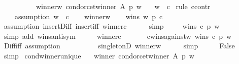 \begin{isabellebody}
\ \ \ \ \ \ \ \ \ \ winner{\isacharunderscore}{\kern0pt}w{\isacharcolon}{\kern0pt}\ {\isachardoublequoteopen}condorcet{\isacharunderscore}{\kern0pt}winner\ A\ p\ w{\isachardoublequoteclose}\isanewline
\ \ \ {\isachardoublequoteopen}w\ {\isacharequal}{\kern0pt}\ c{\isachardoublequoteclose}\isanewline
%
\isadelimproof
%
\endisadelimproof
%
\isatagproof
{}\isamarkupfalse%
\ {\isacharparenleft}{\kern0pt}rule\ ccontr{\isacharparenright}{\kern0pt}\isanewline
\ \ \isamarkupfalse%
\isanewline
\ \ \ \ assumption{\isacharcolon}{\kern0pt}\ {\isachardoublequoteopen}w\ {\isasymnoteq}\ c{\isachardoublequoteclose}\isanewline
\ \ \isamarkupfalse%
\ winner{\isacharunderscore}{\kern0pt}w\isanewline
\ \ \isamarkupfalse%
\ {\isachardoublequoteopen}wins\ w\ p\ c{\isachardoublequoteclose}\isanewline
\ \ \ \ \isamarkupfalse%
\ assumption\ insert{\isacharunderscore}{\kern0pt}Diff\ insert{\isacharunderscore}{\kern0pt}iff\ winner{\isacharunderscore}{\kern0pt}c\isanewline
\ \ \ \ \isamarkupfalse%
\ simp\isanewline
\ \ \isamarkupfalse%
\ {\isachardoublequoteopen}{\isasymnot}\ wins\ c\ p\ w{\isachardoublequoteclose}\isanewline
\ \ \ \ \isamarkupfalse%
\ {\isacharparenleft}{\kern0pt}simp\ add{\isacharcolon}{\kern0pt}\ wins{\isacharunderscore}{\kern0pt}antisym{\isacharparenright}{\kern0pt}\isanewline
\ \ \isamarkupfalse%
\ \isamarkupfalse%
\ winner{\isacharunderscore}{\kern0pt}c\isanewline
\ \ \isamarkupfalse%
\isanewline
\ \ \ \ c{\isacharunderscore}{\kern0pt}wins{\isacharunderscore}{\kern0pt}against{\isacharunderscore}{\kern0pt}w{\isacharcolon}{\kern0pt}\ {\isachardoublequoteopen}wins\ c\ p\ w{\isachardoublequoteclose}\isanewline
\ \ \ \ \isamarkupfalse%
\ Diff{\isacharunderscore}{\kern0pt}iff\ assumption\isanewline
\ \ \ \ \ \ \ \ \ \ singletonD\ winner{\isacharunderscore}{\kern0pt}w\isanewline
\ \ \ \ \isamarkupfalse%
\ simp\isanewline
\ \ \isamarkupfalse%
\ \isamarkupfalse%
\ False\isanewline
\ \ \ \ \isamarkupfalse%
\ simp\isanewline
{}\isamarkupfalse%
%
\endisatagproof
{\isafoldproof}%
%
\isadelimproof
\isanewline
%
\endisadelimproof
\isanewline
{}\isamarkupfalse%
\ cond{\isacharunderscore}{\kern0pt}winner{\isacharunderscore}{\kern0pt}unique{}{\isacharcolon}{\kern0pt}\isanewline
\ \ \ winner{\isacharcolon}{\kern0pt}\ {\isachardoublequoteopen}condorcet{\isacharunderscore}{\kern0pt}winner\ A\ p\ w{\isachardoublequoteclose}\ \isanewline

\end{isabellebody}
